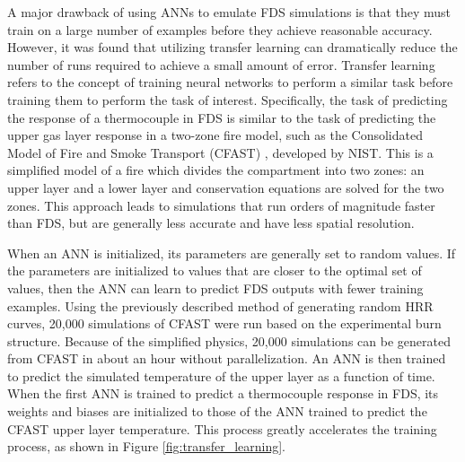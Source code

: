 \documentclass{article}
\begin{document}
A major drawback of using ANNs to emulate FDS simulations is that they must train on a large number of examples before they achieve reasonable accuracy. However, it was found that utilizing transfer learning can dramatically reduce the number of runs required to achieve a small amount of error. Transfer learning refers to the concept of training neural networks to perform a similar task before training them to perform the task of interest. Specifically, the task of predicting the response of a thermocouple in FDS is similar to the task of predicting the upper gas layer response in a two-zone fire model, such as the Consolidated Model of Fire and Smoke Transport (CFAST) \cite{peacock1993cfast}, developed by NIST. This is a simplified model of a fire which divides the compartment into two zones: an upper layer and a lower layer and conservation equations are solved for the two zones. This approach leads to simulations that run orders of magnitude faster than FDS, but are generally less accurate and have less spatial resolution. 

When an ANN is initialized, its parameters are generally set to random values. If the parameters are initialized to values that are closer to the optimal set of values, then the ANN can learn to predict FDS outputs with fewer training examples. Using the previously described method of generating random HRR curves, 20,000 simulations of CFAST were run based on the experimental burn structure. Because of the simplified physics, 20,000 simulations can be generated from CFAST in about an hour without parallelization. An ANN is then trained to predict the simulated temperature of the upper layer as a function of time. When the first ANN is trained to predict a thermocouple response in FDS, its weights and biases are initialized to those of the ANN trained to predict the CFAST upper layer temperature. This process greatly accelerates the training process, as shown in Figure \ref{fig:transfer_learning}. 
\end{document}
